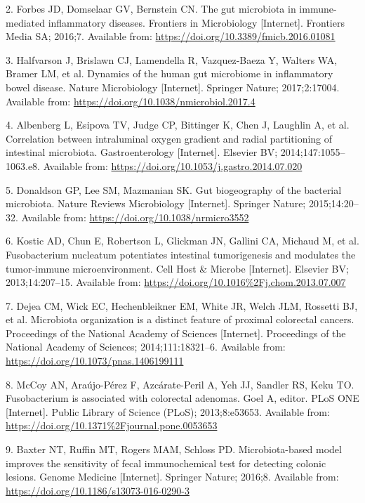 \documentclass[12pt,]{article}
\begin{document}
\hypertarget{ref-Forbes2016}{}
2. Forbes JD, Domselaar GV, Bernstein CN. The gut microbiota in
immune-mediated inflammatory diseases. Frontiers in Microbiology
{[}Internet{]}. Frontiers Media SA; 2016;7. Available from:
\url{https://doi.org/10.3389/fmicb.2016.01081}

\hypertarget{ref-Halfvarson2017}{}
3. Halfvarson J, Brislawn CJ, Lamendella R, Vazquez-Baeza Y, Walters WA,
Bramer LM, et al. Dynamics of the human gut microbiome in inflammatory
bowel disease. Nature Microbiology {[}Internet{]}. Springer Nature;
2017;2:17004. Available from:
\url{https://doi.org/10.1038/nmicrobiol.2017.4}

\hypertarget{ref-Albenberg2014}{}
4. Albenberg L, Esipova TV, Judge CP, Bittinger K, Chen J, Laughlin A,
et al. Correlation between intraluminal oxygen gradient and radial
partitioning of intestinal microbiota. Gastroenterology {[}Internet{]}.
Elsevier BV; 2014;147:1055--1063.e8. Available from:
\url{https://doi.org/10.1053/j.gastro.2014.07.020}

\hypertarget{ref-Donaldson2015}{}
5. Donaldson GP, Lee SM, Mazmanian SK. Gut biogeography of the bacterial
microbiota. Nature Reviews Microbiology {[}Internet{]}. Springer Nature;
2015;14:20--32. Available from:
\url{https://doi.org/10.1038/nrmicro3552}

\hypertarget{ref-Kostic_2013}{}
6. Kostic AD, Chun E, Robertson L, Glickman JN, Gallini CA, Michaud M,
et al. Fusobacterium nucleatum potentiates intestinal tumorigenesis and
modulates the tumor-immune microenvironment. Cell Host \& Microbe
{[}Internet{]}. Elsevier BV; 2013;14:207--15. Available from:
\url{https://doi.org/10.1016\%2Fj.chom.2013.07.007}

\hypertarget{ref-Dejea2014}{}
7. Dejea CM, Wick EC, Hechenbleikner EM, White JR, Welch JLM, Rossetti
BJ, et al. Microbiota organization is a distinct feature of proximal
colorectal cancers. Proceedings of the National Academy of Sciences
{[}Internet{]}. Proceedings of the National Academy of Sciences;
2014;111:18321--6. Available from:
\url{https://doi.org/10.1073/pnas.1406199111}

\hypertarget{ref-McCoy_2013}{}
8. McCoy AN, Araújo-Pérez F, Azcárate-Peril A, Yeh JJ, Sandler RS, Keku
TO. Fusobacterium is associated with colorectal adenomas. Goel A,
editor. PLoS ONE {[}Internet{]}. Public Library of Science (PLoS);
2013;8:e53653. Available from:
\url{https://doi.org/10.1371\%2Fjournal.pone.0053653}

\hypertarget{ref-Baxter2016}{}
9. Baxter NT, Ruffin MT, Rogers MAM, Schloss PD. Microbiota-based model
improves the sensitivity of fecal immunochemical test for detecting
colonic lesions. Genome Medicine {[}Internet{]}. Springer Nature;
2016;8. Available from: \url{https://doi.org/10.1186/s13073-016-0290-3}
\end{document}
